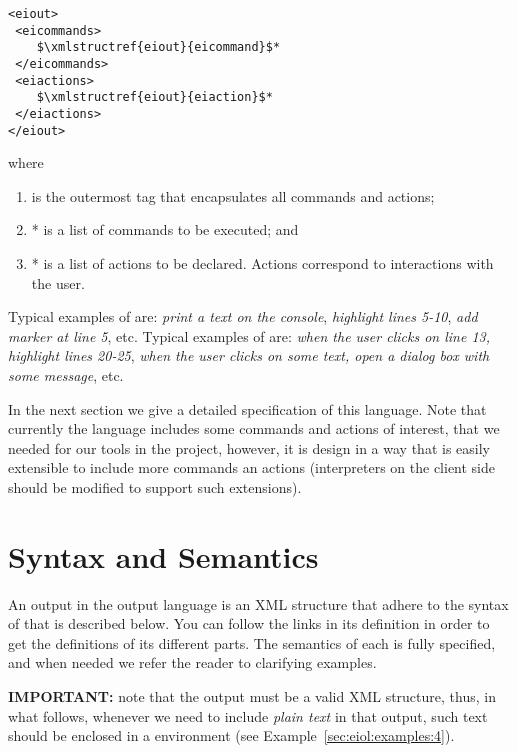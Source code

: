 \medskip
\noindent
\begin{lstlisting}
<eiout> 
 <eicommands>
    $\xmlstructref{eiout}{eicommand}$*
 </eicommands>
 <eiactions>
    $\xmlstructref{eiout}{eiaction}$*
 </eiactions>
</eiout>
\end{lstlisting}

\medskip
\noindent
where
\begin{enumerate}
\item {} is the outermost tag that encapsulates all commands
  and actions;
\item {}* is a list of commands to be
  executed; and
\item {}* is a list of actions to be
  declared. Actions correspond to interactions with the user.
\end{enumerate}
%
Typical examples of  are: \emph{print a
  text on the console}, \emph{highlight lines 5-10}, \emph{add marker
  at line 5}, etc.
%
Typical examples of  are: \emph{when the
  user clicks on line 13, highlight lines 20-25}, \emph{when the user
  clicks on some text, open a dialog box with some message}, etc.

In the next section we give a detailed specification of this
language. Note that currently the language includes some commands and
actions of interest, that we needed for our tools in the \envisage
project, however, it is design in a way that is easily extensible to
include more commands an actions (interpreters on the client side
should be modified to support such extensions).

\section{Syntax and Semantics}
\label{sec:eiol:spec}


An output in the \ei output language is an XML structure that adhere
to the syntax of  that is described
below. You can follow the links in its definition in order to get the
definitions of its different parts. 
%
The semantics of each is fully specified, and when needed we refer the
reader to clarifying examples.

\bigskip
\noindent
\textbf{IMPORTANT:} note that the output must be a valid XML
structure, thus, in what follows, whenever we need to include
\emph{plain text} in that output, such text should be enclosed in a
 environment (see
Example~\ref{sec:eiol:examples:4}).


